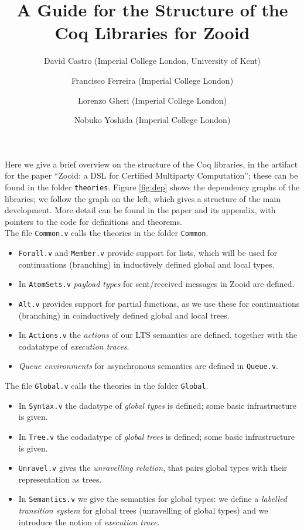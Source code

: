 \documentclass[11pt, a4paper,UKenglish,cleveref, autoref, thm-restate]{article}
\title{\bf A Guide for the Structure of the Coq Libraries for Zooid}
\author{David Castro (Imperial College London, University of Kent) \and Francisco Ferreira (Imperial College London) \and Lorenzo Gheri (Imperial College London)\and Nobuko Yoshida (Imperial College London)}
\begin{document}
\maketitle



Here we give a brief overview on the structure of the Coq libraries, in the artifact for the paper ``Zooid: a DSL for Certified Multiparty Computation''; these can be found in the folder \texttt{theories}. Figure \ref{fig:dep} shows the dependency graphs of the libraries; we follow the graph on the left, which gives a structure of the main development. More detail can be found in the paper and its appendix, with pointers to the code for definitions and theorems.\\

The file \texttt{Common.v} calls the theories in the folder \texttt{Common}.
\begin{itemize}
\item \texttt{Forall.v} and \texttt{Member.v} provide support for lists, which will be used for continuations (branching) in inductively defined global and local types.
\item In \texttt{AtomSets.v} \emph{payload types} for sent/received messages in Zooid are defined.
\item \texttt{Alt.v} provides support for partial functions, as we use these for continuations (branching) in coinductively defined global and local trees.
\item In \texttt{Actions.v} the \emph{actions} of our LTS semantics are defined, together with the codatatype of \emph{execution traces}.
\item \emph{Queue environments} for asynchronous semantics are defined in \texttt{Queue.v}.
\end{itemize}

The file \texttt{Global.v} calls the theories in the folder \texttt{Global}.
\begin{itemize}
\item In \texttt{Syntax.v} the dadatype of \emph{global types} is defined; some basic infrastructure is given.
\item In \texttt{Tree.v} the codadatype of \emph{global trees} is defined; some basic infrastructure is given.
\item \texttt{Unravel.v} gives the \emph{unravelling relation}, that pairs global types with their representation as trees.
\item In \texttt{Semantics.v} we give the semantics for global types: we define a \emph{labelled transition system} for global trees (unravelling of global types) and we introduce the notion of \emph{execution trace}.
\end{itemize}
\end{document}
